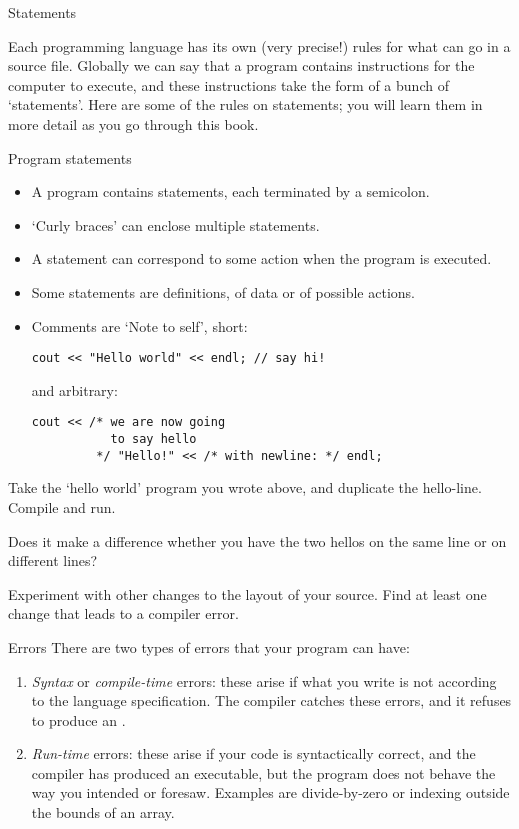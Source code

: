  {Statements}
\label{sec:statements}

Each programming language has its own (very precise!) rules for what
can go in a source file. Globally we can say that a program contains
instructions for the computer to execute, and these instructions take
the form of a bunch of `statements'. Here are some of the rules on
statements; you will learn them in more detail as you go through this
book.

\begin{block}{Program statements}
  \label{sl:cstatement}
  \begin{itemize}
  \item
    A program contains statements, each terminated by a semicolon.
  \item `Curly braces' can enclose multiple statements.
  \item A statement can correspond to some action when the program is
    executed.
  \item Some statements are definitions, of data or of possible actions.
  \item Comments are `Note to self', short:
\begin{verbatim}
cout << "Hello world" << endl; // say hi!
\end{verbatim}
and arbitrary:
\begin{verbatim}
cout << /* we are now going
           to say hello
         */ "Hello!" << /* with newline: */ endl;
\end{verbatim}
  \end{itemize}
\end{block}

\begin{exercise}
  \label{ex:hello-line}
  Take the `hello world' program you wrote above, and duplicate the
  hello-line. Compile and run.

  Does it make a difference whether you have the two hellos on the
  same line or on different lines?

  Experiment with other changes to the layout of your source. Find at
  least one change that leads to a compiler error.
\end{exercise}

\begin{block}{Errors}
  \label{sl:program-errors}
  There are two types of errors that your program can have:
  \begin{enumerate}
  \item \emph{Syntax} or
    \emph{compile-time} errors: these arise
    if what you write is not according to the language specification.
    The compiler catches these errors, and it refuses to produce an
    .
  \item \emph{Run-time} errors: these arise if
    your code is syntactically correct, and the compiler has produced
    an executable, but the program does not behave the way you
    intended or foresaw. Examples are divide-by-zero or indexing
    outside the bounds of an array.
  \end{enumerate}
\end{block}

